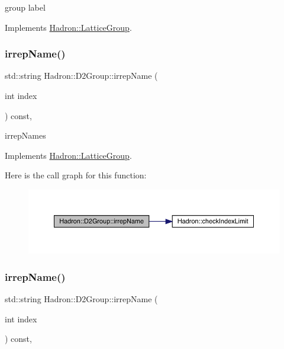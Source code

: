 group label 

Implements \mbox{\hyperlink{structHadron_1_1LatticeGroup_a82208a322bf1b1db489f16af38e70087}{Hadron\+::\+Lattice\+Group}}.

\mbox{\label{structHadron_1_1D2Group_a502111e32a238c50b248b9f7b0625385}} 
\subsubsection{\texorpdfstring{irrepName()}{irrepName()}\hspace{0.1cm}{\footnotesize\ttfamily [1/3]}}
{\footnotesize\ttfamily std\+::string Hadron\+::\+D2\+Group\+::irrep\+Name (\begin{DoxyParamCaption}\item[{int}]{index }\end{DoxyParamCaption}) const\hspace{0.3cm}{\ttfamily [inline]}, {\ttfamily [virtual]}}

irrep\+Names 

Implements \mbox{\hyperlink{structHadron_1_1LatticeGroup_a4bc5620218c2a73157e19bc4451fe746}{Hadron\+::\+Lattice\+Group}}.

Here is the call graph for this function\+:
\nopagebreak
\begin{figure}[H]
\begin{center}
\leavevmode
\includegraphics[width=350pt]{d8/de7/structHadron_1_1D2Group_a502111e32a238c50b248b9f7b0625385_cgraph}
\end{center}
\end{figure}
\mbox{\label{structHadron_1_1D2Group_a502111e32a238c50b248b9f7b0625385}} 
\subsubsection{\texorpdfstring{irrepName()}{irrepName()}\hspace{0.1cm}{\footnotesize\ttfamily [2/3]}}
{\footnotesize\ttfamily std\+::string Hadron\+::\+D2\+Group\+::irrep\+Name (\begin{DoxyParamCaption}\item[{int}]{index }\end{DoxyParamCaption}) const\hspace{0.3cm}{\ttfamily [inline]}, {\ttfamily [virtual]}}

